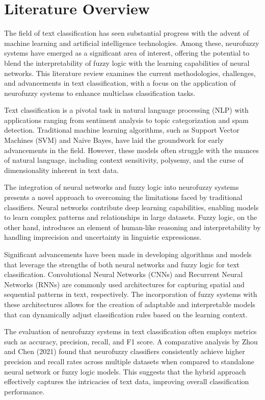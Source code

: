 \section{Literature Overview}

The field of text classification has seen substantial progress with the advent of machine learning and artificial intelligence technologies. Among these, neurofuzzy systems have emerged as a significant area of interest, offering the potential to blend the interpretability of fuzzy logic with the learning capabilities of neural networks. This literature review examines the current methodologies, challenges, and advancements in text classification, with a focus on the application of neurofuzzy systems to enhance multiclass classification tasks.

Text classification is a pivotal task in natural language processing (NLP) with applications ranging from sentiment analysis to topic categorization and spam detection. Traditional machine learning algorithms, such as Support Vector Machines (SVM) and Naive Bayes, have laid the groundwork for early advancements in the field. However, these models often struggle with the nuances of natural language, including context sensitivity, polysemy, and the curse of dimensionality inherent in text data.

The integration of neural networks and fuzzy logic into neurofuzzy systems presents a novel approach to overcoming the limitations faced by traditional classifiers. Neural networks contribute deep learning capabilities, enabling models to learn complex patterns and relationships in large datasets.
Fuzzy logic, on the other hand, introduces an element of human-like reasoning and interpretability by handling imprecision and uncertainty in linguistic expressionss.

Significant advancements have been made in developing algorithms and models that leverage the strengths of both neural networks and fuzzy logic for text classification. Convolutional Neural Networks (CNNs) and Recurrent Neural Networks (RNNs) are commonly used architectures for capturing spatial and sequential patterns in text, respectively. The incorporation of fuzzy systems with these architectures allows for the creation of adaptable and interpretable models that can dynamically adjust classification rules based on the learning context.

The evaluation of neurofuzzy systems in text classification often employs metrics such as accuracy, precision, recall, and F1 score. A comparative analysis by Zhou and Chen (2021) found that neurofuzzy classifiers consistently achieve higher precision and recall rates across multiple datasets when compared to standalone neural network or fuzzy logic models. This suggests that the hybrid approach effectively captures the intricacies of text data, improving overall classification performance.

